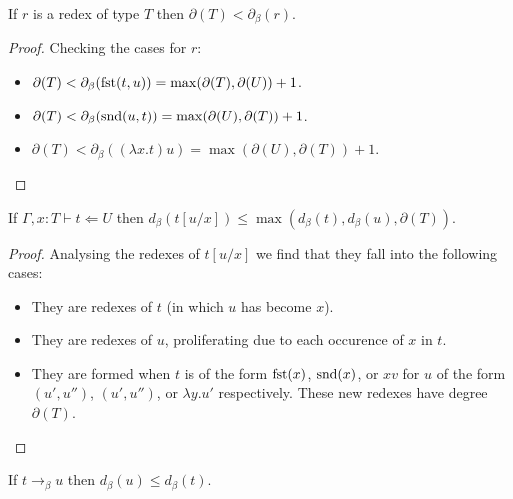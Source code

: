 \begin{lemma}\label{beta_redex_ineq}
    If $r$ is a redex of type $T$ then $\partial(T) < \partial_{\beta}(r)$. 
\end{lemma}

\begin{proof}
    Checking the cases for $r$:
    \begin{itemize}
        \item $\partial (T) < \partial_{\beta}(\mathrm{fst}(t, u)) = \max(\partial(T), \partial(U)) + 1$.
        \item $\partial (T) < \partial_{\beta}(\mathrm{snd}(u, t)) = \max(\partial(U), \partial(T)) + 1$.
        \item $\partial (T) < \partial_{\beta}((\lambda x . t)u) = \max(\partial(U), \partial(T)) + 1$.
    \end{itemize}
\end{proof}

\begin{lemma}\label{beta_sub_ineq}
    If $\Gamma , x : T \vdash t \Leftarrow U$ then $d_{\beta}(t[u/x]) \leq \max(d_{\beta}(t), d_{\beta}(u), \partial(T))$.
\end{lemma}

\begin{proof}
    Analysing the redexes of $t[u/x]$ we find that they fall into the following cases:
    \begin{itemize}
        \item They are redexes of $t$ (in which $u$ has become $x$).
        \item They are redexes of $u$, proliferating due to each occurence of $x$ in $t$.
        \item They are formed when $t$ is of the form $\mathrm{fst}(x)$, $\mathrm{snd}(x)$, or $x v$ for $u$ of the form $(u', u'')$, $(u', u'')$, or $\lambda y . u'$ respectively. These new redexes have degree $\partial(T)$.
    \end{itemize}
\end{proof}

\begin{lemma}\label{beta_reduct_ineq}
    If $t \to_{\beta} u$ then $d_{\beta}(u) \le d_{\beta}(t)$.    
\end{lemma}

